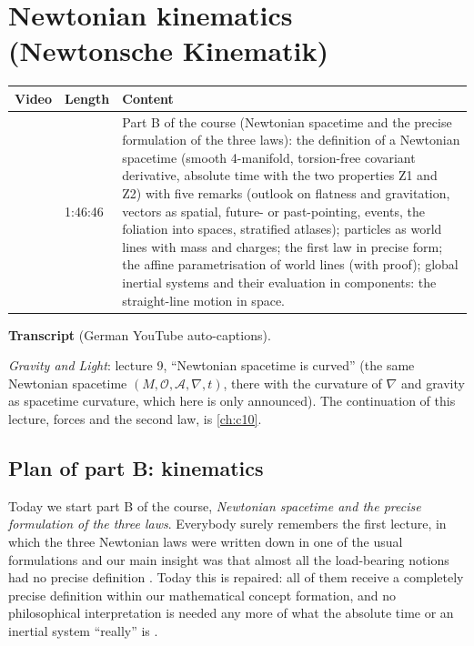 \chapter{Newtonian kinematics (Newtonsche Kinematik)}\label{ch:c08}
\begin{paracol}{2}

\begin{sources}
\begin{tabularx}{\linewidth}{@{}l l L@{}}
\toprule
\textbf{Video} & \textbf{Length} & \textbf{Content}\\
\midrule
{} & 1:46:46 & Part B of the course (Newtonian spacetime and the precise
formulation of the three laws): the definition of a Newtonian spacetime (smooth 4-manifold, torsion-free covariant derivative,
absolute time with the two properties Z1 and Z2) with five remarks (outlook on flatness and gravitation, vectors as spatial,
future- or past-pointing, events, the foliation into spaces, stratified atlases); particles as world lines with mass and
charges; the first law in precise form; the affine parametrisation of world lines (with proof); global inertial systems and their
evaluation in components: the straight-line motion in space.\\
\bottomrule
\end{tabularx}

\smallskip
\textbf{Transcript}  (German YouTube auto-captions).
\end{sources}

\begin{reading}
\emph{Gravity and Light}: lecture 9, ``Newtonian spacetime is curved'' (the same Newtonian spacetime
$(M,\mathcal O,\mathcal A,\nabla,t)$, there with the curvature of $\nabla$ and gravity as spacetime curvature, which
here is only announced). The continuation of this lecture, forces and the second law, is \cref{ch:c10}.
\end{reading}

\section{Plan of part B: kinematics}\label{sec:nk-plan}

Today we start part B of the course, \emph{Newtonian spacetime and the precise formulation of the three laws}. Everybody surely remembers
the first lecture, in which the three Newtonian laws were written down in one of the usual formulations and our main insight was that
almost all the load-bearing notions had no precise definition . Today this is repaired: all of them receive a completely
precise definition within our mathematical concept formation, and no philosophical interpretation is needed any more of what the
absolute time or an inertial system ``really'' is .


\end{paracol}
